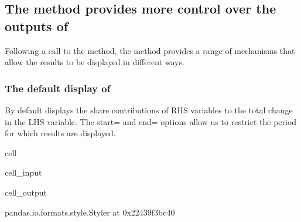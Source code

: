 \documentclass[letterpaper,10pt,english]{jupyterBook}
\begin{document}
\subsection{The  method provides more control over the outputs of }
\label{\detokenize{content/06_ModelAnalytics/AttributionSomeFeatures:the-get-att-method-provides-more-control-over-the-outputs-of-dekomp}}
\sphinxAtStartPar
Following a call to the  method, the  method provides a range of mechanisms that allow the results to be displayed in different ways.


\subsubsection{The default display of }
\label{\detokenize{content/06_ModelAnalytics/AttributionSomeFeatures:the-default-display-of-get-act}}
\sphinxAtStartPar
By default  displays the share contributions of RHS variables to the total change in the LHS variable.  The start= and end= options allow us to restrict the period for which results are displayed.

\begin{sphinxuseclass}{cell}\begin{sphinxVerbatimInput}

\begin{sphinxuseclass}{cell_input}
\begin{sphinxVerbatim}[commandchars=\\\{\}]
\end{sphinxVerbatim}

\end{sphinxuseclass}\end{sphinxVerbatimInput}
\begin{sphinxVerbatimOutput}

\begin{sphinxuseclass}{cell_output}
\begin{sphinxVerbatim}[commandchars=\\\{\}]
\PYGZlt{}pandas.io.formats.style.Styler at 0x22439f3bc40\PYGZgt{}
\end{sphinxVerbatim}

\end{sphinxuseclass}\end{sphinxVerbatimOutput}

\end{sphinxuseclass}
\end{document}
